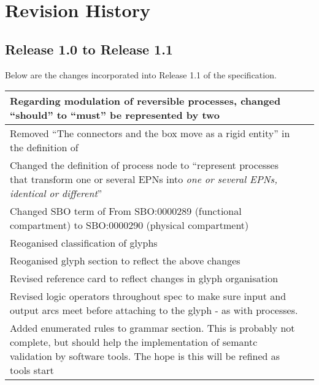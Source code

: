 \chapter{Revision History}

\section{Release 1.0 to Release 1.1}

Below are the changes incorporated into Release 1.1 of the \SBGNPDLone specification.

\begin{center}
\label{tab:revision history}
\tablelasttail{\hline}
\begin{supertabular}{|p{12cm}|c|}\hline
Regarding modulation of reversible processes, changed ``should'' to ``must'' be represented by two  & \\\hline
Removed ``The connectors and the box move as a rigid entity'' in the definition of  & \\\hline
Changed the definition of process node to ``represent processes that transform one or several EPNs into \emph{one or several EPNs, identical or different}''& \\\hline
Changed SBO term of  From SBO:0000289 (functional compartment) to SBO:0000290 (physical compartment) & \\\hline
Reoganised classification of glyphs & \\\hline
Reoganised glyph section to reflect the above changes & \\\hline
Revised reference card to reflect changes in glyph organisation &
\\\hline
Revised logic operators throughout spec to make sure input and output
arcs meet before attaching to the glyph - as with processes. &
\\\hline
Added enumerated rules to grammar section. This is probably not
complete, but should help the implementation of semantc validation by
software tools. The hope is this will be refined as tools start

\end{supertabular}
\end{center}
